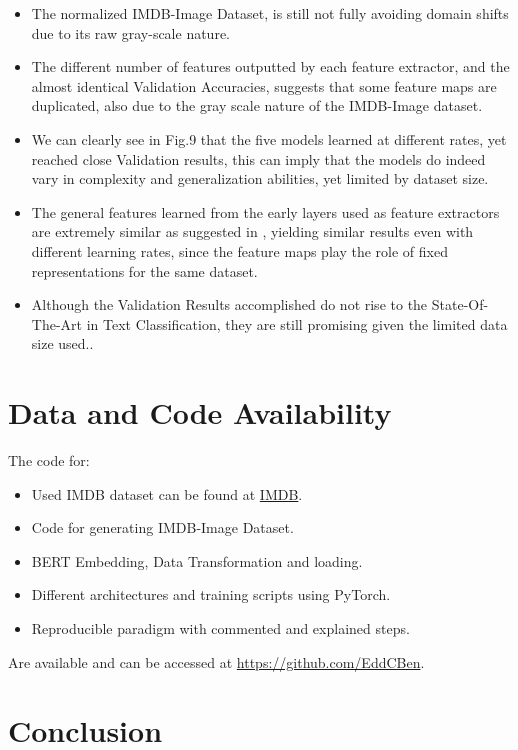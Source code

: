 \documentclass[conference]{IEEEtran}
\begin{document}
\begin{itemize}
    \item The normalized IMDB-Image Dataset, is still not fully avoiding domain shifts due to its raw gray-scale nature.
    \item The different number of features outputted by each feature extractor, and the almost identical Validation Accuracies, suggests that some feature maps are duplicated, also due to the gray scale nature of the IMDB-Image dataset.
    \item We can clearly see in Fig.9 that the five models learned at different rates, yet reached close Validation results, this can imply that the models do indeed vary in complexity and generalization abilities, yet limited by dataset size.
    \item The general features learned from the early layers used as feature extractors are extremely similar as suggested in \cite{howtransferable}, yielding similar results even with different learning rates, since the feature maps play the role of fixed representations for the same dataset.
    \item Although the Validation Results accomplished do not rise to the State-Of-The-Art in Text Classification, they are still promising given the limited data size used..

\end{itemize}

\section{Data and Code Availability}
The code for:
\begin{itemize}
    \item Used IMDB dataset can be found at \href{https://www.kaggle.com/lakshmi25npathi/imdb-dataset-of-50k-movie-reviews}{IMDB}.
    \item Code for generating IMDB-Image Dataset.
    \item BERT Embedding, Data Transformation and loading.
    \item Different architectures and training scripts using PyTorch.
    \item Reproducible paradigm with commented and explained steps.
\end{itemize}

Are available and can be accessed at \url{https://github.com/EddCBen}.\newline
\newpage
\section{Conclusion}
\end{document}
